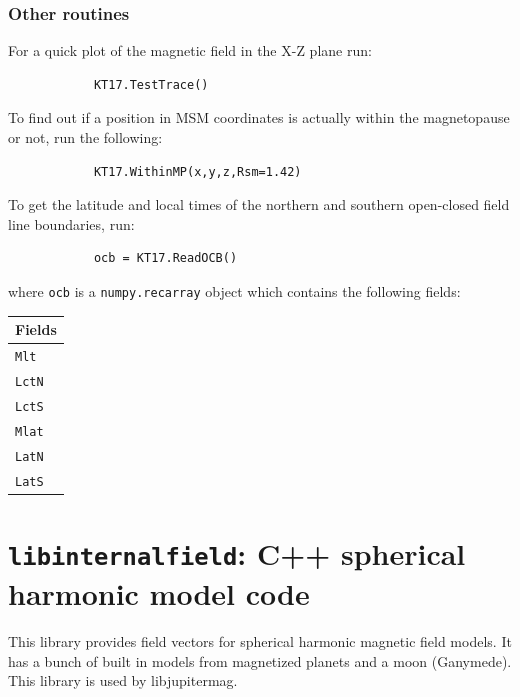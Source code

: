			\subsubsection{Other routines}
			
			For a quick plot of the magnetic field in the X-Z plane run:
			
			\begin{verbatim}
			KT17.TestTrace()
			\end{verbatim}
			
			To find out if a position in MSM coordinates is actually within the magnetopause or not, run the following:
			
			\begin{verbatim}
			KT17.WithinMP(x,y,z,Rsm=1.42)
			\end{verbatim}
			
			To get the latitude and local times of the northern and southern open-closed field line boundaries, run:
			
			\begin{verbatim}
			ocb = KT17.ReadOCB()
			\end{verbatim}
			
			where \texttt{ocb} is a \texttt{numpy.recarray} object which contains the following fields:
			
			\begin{table}[H]
			\centering
			\begin{tabular}{|l|}
			\hline
			Fields \\
			\hline
			\texttt{Mlt} \\
			\texttt{LctN} \\
			\texttt{LctS} \\
			\texttt{Mlat} \\
			\texttt{LatN} \\
			\texttt{LatS} \\
			\hline
			\end{tabular}
			\end{table}


	\section{\texttt{libinternalfield}: C++ spherical harmonic model code}

		This library provides field vectors for spherical harmonic magnetic field models. It has a bunch of built in models from magnetized planets and a moon (Ganymede). This library is used by libjupitermag.

